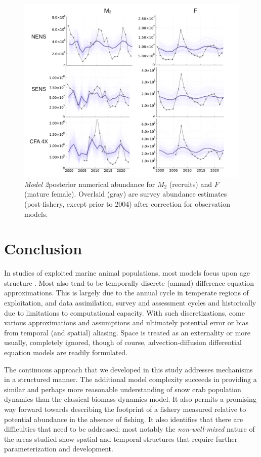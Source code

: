 \documentclass[
	letterpaper, %
	10pt, %
]{article}
\begin{document}
	
\begin{figure}
	\includegraphics[width=\linewidth]{media/m2_fem.png}
	\caption{\emph{Model 2}posterior numerical abundance for $M_{2}$ (recruits) and 
	$F$ (mature female). Overlaid (gray) are survey abundance estimates (post-fishery,
	except prior to 2004) after correction for observation models.}
	\label{fig6_m2f}
	\end{figure}   

	  
	  

\section{Conclusion}

In studies of exploited marine animal populations, most models focus
upon age structure \cite{Quinn_2003}.
Most also tend to be temporally discrete (annual) difference equation approximations. This is largely due to the annual cycle in temperate regions of exploitation,
and data assimilation, survey and assessment cycles and historically
due to limitations to computational capacity. With such discretizations,
come various approximations and assumptions and ultimately potential
error or bias from temporal (and spatial) aliasing. Space is treated
as an externality or more usually, completely ignored, though of course,
advection-diffusion differential equation models are readily formulated.

The continuous approach that we developed in this study addresses
mechanisms in a structured manner. The additional model complexity
succeeds in providing a similar and perhaps more reasonable understanding
of snow crab population dynamics than the classical biomass dynamics
model. It also permits a promising way forward towards describing
the footprint of a fishery measured relative to potential abundance
in the absence of fishing. It also identifies that there are difficulties
that need to be addressed: most notably the \emph{non-well-mixed} nature
of the areas studied show spatial and temporal structures that require
further parameterization and development.
\end{document}
